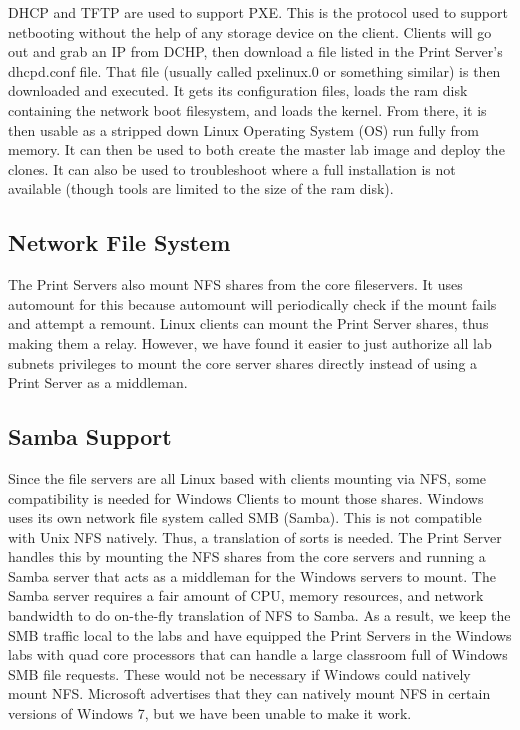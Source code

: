 DHCP and TFTP are used to support PXE.  This is the protocol used to support netbooting without the help of any storage device on the client.  Clients will go out and grab an IP from DCHP, then download a file listed in the Print Server's dhcpd.conf file.  That file (usually called pxelinux.0 or something similar) is then downloaded and executed.  It gets its configuration files, loads the ram disk containing the network boot filesystem, and loads the kernel.  From there, it is then usable as a stripped down Linux Operating System (OS) run fully from memory.  It can then be used to both create the master lab image and deploy the clones.  It can also be used to troubleshoot where a full installation is not available (though tools are limited to the size of the ram disk).

\subsection{Network File System}
The Print Servers also mount NFS shares from the core fileservers.  It uses automount for this because automount will periodically check if the mount fails and attempt a remount.  Linux clients can mount the Print Server shares, thus making them a relay.  However, we have found it easier to just authorize all lab subnets privileges to mount the core server shares directly instead of using a Print Server as a middleman.  

\subsection{Samba Support}
Since the file servers are all Linux based with clients mounting via NFS, some compatibility is needed for Windows Clients to mount those shares.  Windows uses its own network file system called SMB (Samba).  This is not compatible with Unix NFS natively.  Thus, a translation of sorts is needed.  The Print Server handles this by mounting the NFS shares from the core servers and running a Samba server that acts as a middleman for the Windows servers to mount.  The Samba server requires a fair amount of CPU, memory resources, and network bandwidth to do on-the-fly translation of NFS to Samba. As a result, we keep the SMB traffic local to the labs and have equipped the Print Servers in the Windows labs with quad core processors that can handle a large classroom full of Windows SMB file requests. These would not be necessary if Windows could natively mount NFS. Microsoft advertises that they can natively mount NFS in certain versions of Windows 7, but we have been unable to make it work.

